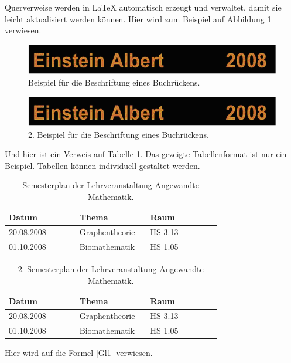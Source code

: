 \documentclass[Master,BMR,german]{BASE/twbook}
\begin{document}
\noindent Querverweise werden in \LaTeX{} automatisch erzeugt und verwaltet, damit sie leicht aktualisiert werden können. Hier wird zum Beispiel auf Abbildung \ref{Abb1} verwiesen.

\begin{figure}[!htbp]
\centering
\includegraphics[width=0.5\linewidth]{PICs/buchruecken}
\caption{Beispiel für die Beschriftung eines Buchrückens.}\label{Abb1}
\end{figure}
\begin{figure}[!htbp]
\centering
\includegraphics[width=0.5\linewidth]{PICs/buchruecken}
\caption{2. Beispiel für die Beschriftung eines Buchrückens.}\label{Abb2}
\end{figure}

Und hier ist ein Verweis auf Tabelle \ref{tab1}. Das gezeigte Tabellenformat ist nur ein Beispiel. Tabellen können individuell gestaltet werden.

\begin{table}[!htbp]
\centering
\caption{Semesterplan der Lehrveranstaltung \glqq Angewandte Mathematik\grqq.}\label{tab1}
\begin{tabular}{| p{0.3\linewidth} | p{0.3\linewidth} | p{0.3\linewidth} |}\hline
Datum & Thema & Raum\\\hline
20.08.2008 & Graphentheorie & HS 3.13\\
01.10.2008 & Biomathematik & HS 1.05\\\hline
\end{tabular}
\end{table}
\begin{table}[!htbp]
\centering
\caption{2. Semesterplan der Lehrveranstaltung \glqq Angewandte Mathematik\grqq.}\label{tab2}
\begin{tabular}{| p{0.3\linewidth} | p{0.3\linewidth} | p{0.3\linewidth} |}\hline
Datum & Thema & Raum\\\hline
20.08.2008 & Graphentheorie & HS 3.13\\
01.10.2008 & Biomathematik & HS 1.05\\\hline
\end{tabular}
\end{table}

Hier wird auf die Formel \ref{Gl1} verwiesen.
\end{document}
